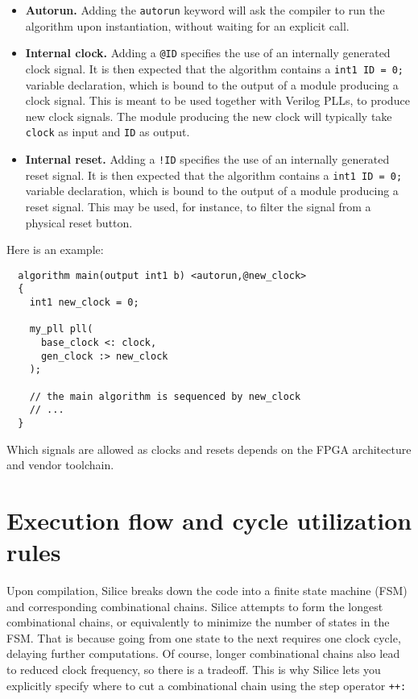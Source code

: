 \documentclass[a4]{article}
\newcommand\verilog{Verilog}
\newcommand\silice{Silice}
\begin{document}
\begin{itemize}
	\item \textbf{Autorun.} Adding the \texttt{autorun} keyword will ask the compiler to run the algorithm upon instantiation, without waiting for an explicit call.
	\item \textbf{Internal clock.} Adding a \texttt{@ID} specifies the use of an internally generated clock signal. It is then expected that the algorithm contains a \texttt{int1 ID = 0;} variable declaration, which is bound to the output of a module producing a clock signal. This is meant to be used together with \verilog{} PLLs, to produce new clock signals. The module producing the new clock will typically take \texttt{clock} as input and \texttt{ID}
	as output.
	\item \textbf{Internal reset.} Adding a \texttt{!ID} specifies the use of an internally generated reset signal. It is then expected that the algorithm contains a \texttt{int1 ID = 0;} variable declaration, which is bound to the output of a module producing a reset signal. This may be used, for instance, to filter the signal from a physical reset button.
\end{itemize}

Here is an example:
\begin{verbatim}
  algorithm main(output int1 b) <autorun,@new_clock>
  {
    int1 new_clock = 0;

    my_pll pll(
      base_clock <: clock,
      gen_clock :> new_clock
    );

    // the main algorithm is sequenced by new_clock
    // ...
  }
\end{verbatim}

Which signals are allowed as clocks and resets depends on the FPGA architecture
and vendor toolchain.



\section{Execution flow and cycle utilization rules}
\label{sec:execflow}

Upon compilation, \silice{} breaks down the code into a finite state machine (FSM) and corresponding combinational chains.
%
\silice{} attempts to form the longest combinational chains, or equivalently
to minimize the number of states in the FSM. That is because going from one state to the next requires one clock cycle, delaying further computations.
%
Of course, longer combinational chains also lead to reduced clock frequency, so
there is a tradeoff. This is why \silice{} lets you explicitly specify where to cut a combinational chain using the step operator \texttt{++:}
\end{document}
